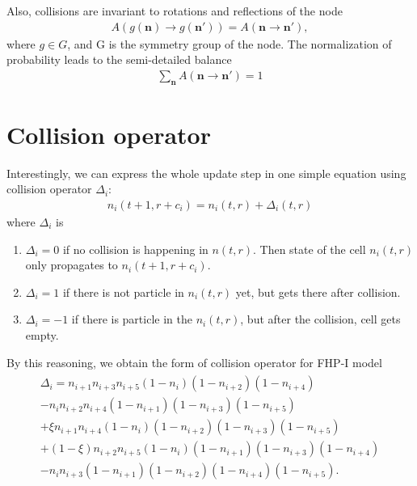 Also, collisions are invariant to rotations and reflections of the node
\begin{align*}
A(g(\bm{n}) \rightarrow g(\bm{n'})) = A(\bm{n} \rightarrow \bm{n'}),
\end{align*}
where $g \in G$, and G is the symmetry group of the node.
The normalization of probability leads to the semi-detailed balance
\begin{align} \label{smd}
\sum_{\bm{n}} A(\bm{n} \rightarrow \bm{n'}) = 1	
\end{align}

\section{Collision operator}
Interestingly, we can express the whole update step in one simple equation using collision operator $\Delta_i$:
\begin{align} \label{withcol}
n_i(t+1,r+c_i) = n_i(t,r) + \Delta_i(t,r)
\end{align}
where $\Delta_i$ is
\begin{enumerate}
\item $\Delta_i = 0$ if no collision is happening in $n(t,r)$. Then state of the cell $n_i(t,r)$ only propagates to $n_i(t+1,r+c_i)$.
\item $\Delta_i = 1$ if there is not particle in $n_i(t,r)$ yet, but gets there after collision. 
\item $\Delta_i = -1$ if there is particle in the $n_i(t,r)$, but after the collision, cell gets empty.
\end{enumerate}

\bigskip


By this reasoning, we obtain the form of collision operator for FHP-I model
\begin{align} \label{colop}
\begin{split}
\Delta_i = n_{i+1}n_{i+3}n_{i+5}(1-n_i)(1-n_{i+2})(1-n_{i+4})\\
-n_in_{i+2}n_{i+4}(1-n_{i+1})(1-n_{i+3})(1-n_{i+5})\\
 + \xi n_{i+1}n_{i+4}(1-n_i)(1-n_{i+2})(1-n_{i+3})(1-n_{i+5})\\
 +(1-\xi)n_{i+2}n_{i+5}(1-n_i)(1-n_{i+1})(1-n_{i+3})(1-n_{i+4})\\
 -n_in_{i+3}(1-n_{i+1})(1-n_{i+2})(1-n_{i+4})(1-n_{i+5}).
\end{split}
\end{align}

